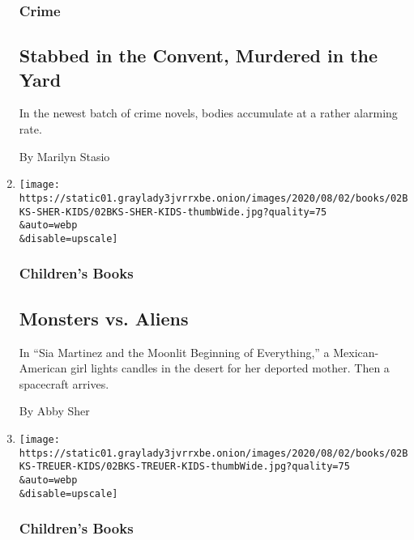 \begin{enumerate}
  \hypertarget{crime}{%
  \subsubsection{Crime}\label{crime}}

  \hypertarget{stabbed-in-the-convent-murdered-in-the-yard}{%
  \subsection{Stabbed in the Convent, Murdered in the
  Yard}\label{stabbed-in-the-convent-murdered-in-the-yard}}

  In the newest batch of crime novels, bodies accumulate at a rather
  alarming rate.

  By Marilyn Stasio
\item
  \href{/2020/07/31/books/review/sia-martinez-and-the-moonlit-beginning-of-everything-raquel-vasquez-gilliland.html}{}

  \texttt{[image: https://static01.graylady3jvrrxbe.onion/images/2020/08/02/books/02BKS-SHER-KIDS/02BKS-SHER-KIDS-thumbWide.jpg?quality=75\\\&auto=webp\\\&disable=upscale]}

  \hypertarget{childrens-books-2}{%
  \subsubsection{Children's Books}\label{childrens-books-2}}

  \hypertarget{monsters-vs-aliens}{%
  \subsection{Monsters vs. Aliens}\label{monsters-vs-aliens}}

  In ``Sia Martinez and the Moonlit Beginning of Everything,'' a
  Mexican-American girl lights candles in the desert for her deported
  mother. Then a spacecraft arrives.

  By Abby Sher
\item
  \href{/2020/07/31/books/review/the-brave-james-bird.html}{}

  \texttt{[image: https://static01.graylady3jvrrxbe.onion/images/2020/08/02/books/02BKS-TREUER-KIDS/02BKS-TREUER-KIDS-thumbWide.jpg?quality=75\\\&auto=webp\\\&disable=upscale]}

  \hypertarget{childrens-books-3}{%
  \subsubsection{Children's Books}\label{childrens-books-3}}


\end{enumerate}
